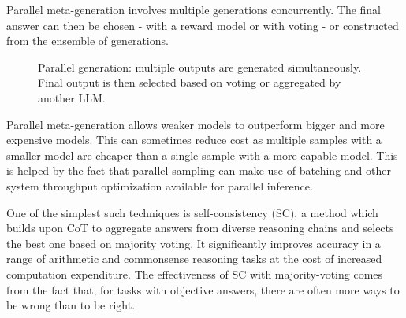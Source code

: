 Parallel meta-generation involves multiple generations concurrently. 
The final answer can then be chosen - with a reward model or with 
voting - or constructed from the ensemble of generations\cite{welleck2024decodingmetagenerationinferencetimealgorithms}.
\begin{figure}[ht]
    \centering
    \caption{Parallel generation: multiple outputs are generated simultaneously. Final output is then selected based on voting or aggregated by another LLM.}
    \label{fig:parallel_generation}
\end{figure}

Parallel meta-generation allows weaker models to outperform bigger and more expensive models\cite{brown2024largelanguagemonkeysscaling}.
This can sometimes reduce cost as multiple samples with a smaller model are cheaper than a single sample with a more capable model.
This is helped by the fact that parallel sampling can make use of batching and other system throughput optimization
available for parallel inference\cite{brown2024largelanguagemonkeysscaling}.

One of the simplest such techniques is self-consistency\cite{wang2023selfconsistencyimproveschainthought} (SC),
a method which builds upon CoT to aggregate answers from diverse reasoning 
chains and selects the best one based on majority voting. 
It significantly improves accuracy in a range of arithmetic and commonsense reasoning tasks 
at the cost of increased computation expenditure\cite{wang2023selfconsistencyimproveschainthought}.
The effectiveness of SC with majority-voting comes from the fact that, for tasks with objective answers, there are often more ways to be wrong than to be right.

